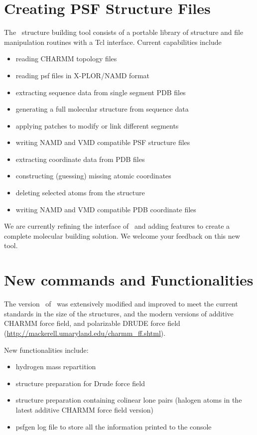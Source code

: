 \section{Creating PSF Structure Files}
\label{section:psfgen}

The \PSFGEN\ structure building tool consists of a portable library
of structure and file manipulation routines with a Tcl interface.
Current capabilities include
\begin{itemize}
\item reading CHARMM topology files
\item reading psf files in X-PLOR/NAMD format
\item extracting sequence data from single segment PDB files
\item generating a full molecular structure from sequence data
\item applying patches to modify or link different segments
\item writing NAMD and VMD compatible PSF structure files
\item extracting coordinate data from PDB files
\item constructing (guessing) missing atomic coordinates
\item deleting selected atoms from the structure
\item writing NAMD and VMD compatible PDB coordinate files
\end{itemize}

We are currently refining the interface of \PSFGEN\ and adding
features to create a complete molecular building solution.
We welcome your feedback on this new tool.

\section{New commands and Functionalities}

The version \PSFGENVER\ of \PSFGEN\ was extensively modified and improved to 
meet the current standards in the size of the structures, and the modern 
versions of additive CHARMM force field, and polarizable DRUDE 
force field (\url{http://mackerell.umaryland.edu/charmm_ff.shtml}). 

\vskip 0.2in
New functionalities include:
\begin{itemize}
\item hydrogen mass repartition
\item structure preparation for Drude force field
\item structure preparation containing colinear lone pairs 
(halogen atoms in the latest additive CHARMM force field version)
\item psfgen log file to store all the information printed to the console
\end{itemize}
\vskip 0.2in

